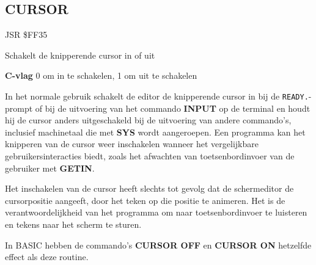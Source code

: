 \subsection{CURSOR}
\label{KERNAL Jump Table!CURSOR}
\begin{description}[leftmargin=2cm,style=nextline]
    \item [Adres:] JSR \$FF35    \item [Omschrijving:] Schakelt de knipperende cursor in of uit    \item [Invoer:]        \textbf{C-vlag} 0 om in te schakelen, 1 om uit te schakelen    \item [Opmerkingen:]        In het normale gebruik schakelt de editor de knipperende cursor in bij de \texttt{READY.}-prompt of bij de uitvoering van het commando {\bf INPUT} op de terminal en houdt hij de cursor anders uitgeschakeld bij de uitvoering van andere commando's, inclusief machinetaal die met {\bf SYS} wordt aangeroepen. Een programma kan het knipperen van de cursor weer inschakelen wanneer het vergelijkbare gebruikersinteracties biedt, zoals het afwachten van toetsenbordinvoer van de gebruiker met {\bf GETIN}.

        Het inschakelen van de cursor heeft slechts tot gevolg dat de schermeditor de cursorpositie aangeeft, door het teken op die positie te animeren. Het is de verantwoordelijkheid van het programma om naar toetsenbordinvoer te luisteren en tekens naar het scherm te sturen.

        In BASIC hebben de commando's {\bf CURSOR OFF} en {\bf CURSOR ON} hetzelfde effect als deze routine.    \item [Voorbeeld:]

\end{description}



\newpage
